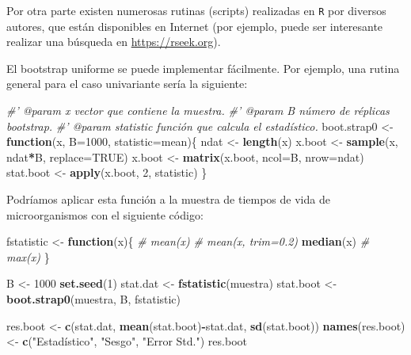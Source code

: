 \documentclass[]{book}
\newenvironment{Shaded}{\begin{snugshade}}{\end{snugshade}}
\newcommand{\KeywordTok}[1]{\textcolor[rgb]{0.13,0.29,0.53}{\textbf{#1}}}
\newcommand{\DataTypeTok}[1]{\textcolor[rgb]{0.13,0.29,0.53}{#1}}
\newcommand{\DecValTok}[1]{\textcolor[rgb]{0.00,0.00,0.81}{#1}}
\newcommand{\StringTok}[1]{\textcolor[rgb]{0.31,0.60,0.02}{#1}}
\newcommand{\CommentTok}[1]{\textcolor[rgb]{0.56,0.35,0.01}{\textit{#1}}}
\newcommand{\OtherTok}[1]{\textcolor[rgb]{0.56,0.35,0.01}{#1}}
\newcommand{\ControlFlowTok}[1]{\textcolor[rgb]{0.13,0.29,0.53}{\textbf{#1}}}
\newcommand{\OperatorTok}[1]{\textcolor[rgb]{0.81,0.36,0.00}{\textbf{#1}}}
\newcommand{\NormalTok}[1]{#1}
\theoremstyle{definition}
\theoremstyle{definition}
\theoremstyle{definition}
\theoremstyle{remark}
\begin{document}
Por otra parte existen numerosas rutinas (scripts) realizadas en
\texttt{R} por diversos autores, que están disponibles en Internet (por
ejemplo, puede ser interesante realizar una búsqueda en
\url{https://rseek.org}).

El bootstrap uniforme se puede implementar fácilmente. Por ejemplo, una
rutina general para el caso univariante sería la siguiente:

\begin{Shaded}
\begin{Highlighting}[]
\CommentTok{#' @param x vector que contiene la muestra.}
\CommentTok{#' @param B número de réplicas bootstrap.}
\CommentTok{#' @param statistic función que calcula el estadístico.}
\NormalTok{boot.strap0 <-}\StringTok{ }\ControlFlowTok{function}\NormalTok{(x, }\DataTypeTok{B=}\DecValTok{1000}\NormalTok{, }\DataTypeTok{statistic=}\NormalTok{mean)\{}
\NormalTok{  ndat <-}\StringTok{ }\KeywordTok{length}\NormalTok{(x)}
\NormalTok{  x.boot <-}\StringTok{ }\KeywordTok{sample}\NormalTok{(x, ndat}\OperatorTok{*}\NormalTok{B, }\DataTypeTok{replace=}\OtherTok{TRUE}\NormalTok{)}
\NormalTok{  x.boot <-}\StringTok{ }\KeywordTok{matrix}\NormalTok{(x.boot, }\DataTypeTok{ncol=}\NormalTok{B, }\DataTypeTok{nrow=}\NormalTok{ndat)}
\NormalTok{  stat.boot <-}\StringTok{ }\KeywordTok{apply}\NormalTok{(x.boot, }\DecValTok{2}\NormalTok{, statistic)}
\NormalTok{\}}
\end{Highlighting}
\end{Shaded}

Podríamos aplicar esta función a la muestra de tiempos de vida de
microorganismos con el siguiente código:

\begin{Shaded}
\begin{Highlighting}[]
\NormalTok{fstatistic <-}\StringTok{ }\ControlFlowTok{function}\NormalTok{(x)\{}
  \CommentTok{#  mean(x)}
  \CommentTok{#  mean(x, trim=0.2)}
  \KeywordTok{median}\NormalTok{(x)}
  \CommentTok{#  max(x)}
\NormalTok{\}}

\NormalTok{B <-}\StringTok{ }\DecValTok{1000}
\KeywordTok{set.seed}\NormalTok{(}\DecValTok{1}\NormalTok{)}
\NormalTok{stat.dat <-}\StringTok{ }\KeywordTok{fstatistic}\NormalTok{(muestra)}
\NormalTok{stat.boot <-}\StringTok{ }\KeywordTok{boot.strap0}\NormalTok{(muestra, B, fstatistic)}

\NormalTok{res.boot <-}\StringTok{ }\KeywordTok{c}\NormalTok{(stat.dat, }\KeywordTok{mean}\NormalTok{(stat.boot)}\OperatorTok{-}\NormalTok{stat.dat, }\KeywordTok{sd}\NormalTok{(stat.boot))}
\KeywordTok{names}\NormalTok{(res.boot) <-}\StringTok{ }\KeywordTok{c}\NormalTok{(}\StringTok{"Estadístico"}\NormalTok{, }\StringTok{"Sesgo"}\NormalTok{, }\StringTok{"Error Std."}\NormalTok{)}
\NormalTok{res.boot}
\end{Highlighting}
\end{Shaded}
\end{document}
